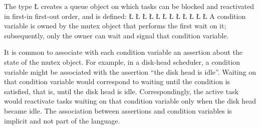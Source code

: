 \documentclass[openright,twoside]{report}
\begin{document}
The type \LGinlinetrue\LGbegin\lgrinde\L{}\endlgrinde\LGend{} creates a queue object on which tasks can be blocked and reactivated in first-in first-out order, and is defined:
\LGinlinefalse\LGbegin\lgrinde
\L{}
\L{}
\L{\LB{}}
\CE{}\L{\LB{}}
\CE{}\L{\LB{}}
\CE{}\L{\LB{}}
\CE{}\L{\LB{}}
\L{\LB{}}
\L{\LB{}}
\L{\LB{}}
\L{\LB{\};}}
\L{}
\endlgrinde\LGend
{}%
%
%
%
%
%
A condition variable is owned by the mutex object that performs the first wait on it;
subsequently, only the owner can wait and signal that condition variable.

\begin{annotation}
It is common to associate with each condition variable an assertion about the state of the mutex object.
For example, in a disk-head scheduler, a condition variable might be associated with the assertion ``the disk head is idle''.
Waiting on that condition variable would correspond to waiting until the condition is satisfied, that is, until the disk head is idle.
Correspondingly, the active task would reactivate tasks waiting on that condition variable only when the disk head became idle.
The association between assertions and condition variables is implicit and not part of the language.
\end{annotation}
\end{document}

